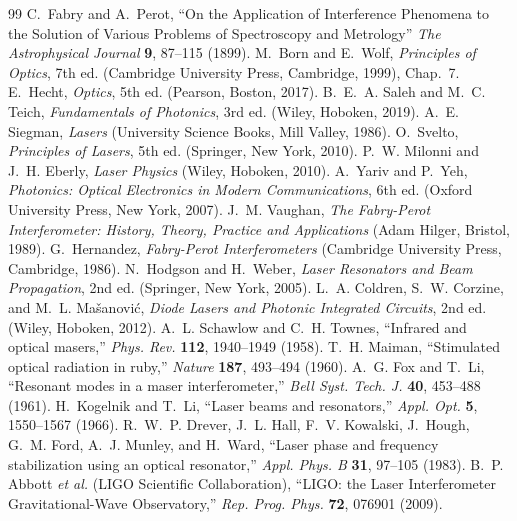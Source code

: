 \documentclass[11pt,a4paper]{article}
\begin{document}
	\begin{thebibliography}{99}
		 C.~Fabry and A.~Perot, ``On the Application of Interference Phenomena to the Solution of Various Problems of Spectroscopy and Metrology'' \emph{The Astrophysical Journal} \textbf{9}, 87--115 (1899).
		 M.~Born and E.~Wolf, \emph{Principles of Optics}, 7th ed. (Cambridge University Press, Cambridge, 1999), Chap.~7.
		 E.~Hecht, \emph{Optics}, 5th ed. (Pearson, Boston, 2017).
		 B.~E.~A. Saleh and M.~C. Teich, \emph{Fundamentals of Photonics}, 3rd ed. (Wiley, Hoboken, 2019).
		 A.~E. Siegman, \emph{Lasers} (University Science Books, Mill Valley, 1986).
		 O.~Svelto, \emph{Principles of Lasers}, 5th ed. (Springer, New York, 2010).
		 P.~W. Milonni and J.~H. Eberly, \emph{Laser Physics} (Wiley, Hoboken, 2010).
		 A.~Yariv and P.~Yeh, \emph{Photonics: Optical Electronics in Modern Communications}, 6th ed. (Oxford University Press, New York, 2007).
		 J.~M. Vaughan, \emph{The Fabry-Perot Interferometer: History, Theory, Practice and Applications} (Adam Hilger, Bristol, 1989).
		 G.~Hernandez, \emph{Fabry-Perot Interferometers} (Cambridge University Press, Cambridge, 1986).
		 N.~Hodgson and H.~Weber, \emph{Laser Resonators and Beam Propagation}, 2nd ed. (Springer, New York, 2005).
		 L.~A. Coldren, S.~W. Corzine, and M.~L. Ma\v{s}anovi\'c, \emph{Diode Lasers and Photonic Integrated Circuits}, 2nd ed. (Wiley, Hoboken, 2012).
		 A.~L. Schawlow and C.~H. Townes, ``Infrared and optical masers,'' \emph{Phys. Rev.} \textbf{112}, 1940--1949 (1958).
		 T.~H. Maiman, ``Stimulated optical radiation in ruby,'' \emph{Nature} \textbf{187}, 493--494 (1960).
		 A.~G. Fox and T.~Li, ``Resonant modes in a maser interferometer,'' \emph{Bell Syst. Tech. J.} \textbf{40}, 453--488 (1961).
		 H.~Kogelnik and T.~Li, ``Laser beams and resonators,'' \emph{Appl. Opt.} \textbf{5}, 1550--1567 (1966).
		 R.~W.~P. Drever, J.~L. Hall, F.~V. Kowalski, J.~Hough, G.~M. Ford, A.~J. Munley, and H.~Ward, ``Laser phase and frequency stabilization using an optical resonator,'' \emph{Appl. Phys. B} \textbf{31}, 97--105 (1983).
		 B.~P. Abbott \emph{et al.} (LIGO Scientific Collaboration), ``LIGO: the Laser Interferometer Gravitational-Wave Observatory,'' \emph{Rep. Prog. Phys.} \textbf{72}, 076901 (2009).
	\end{thebibliography}
	
\end{document}

